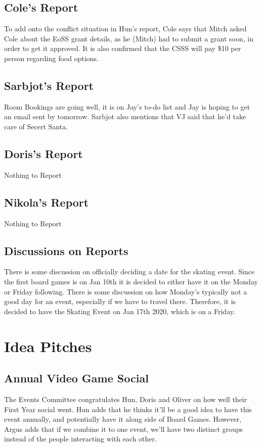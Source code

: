 \documentclass[12pt]{article}
\begin{document}
\subsection{Cole's Report}
\noindent To add onto the conflict situation in Hun's report, Cole says that Mitch asked Cole about the EoSS grant details, as he (Mitch) had to submit a grant soon, in order to get it approved.  It is also confirmed that the CSSS will pay \$10 per person regarding food options. 

\subsection{Sarbjot's Report}
Room Bookings are going well, it is on Jay's to-do list and Jay is hoping to get an email sent by tomorrow.  Sarbjot also mentions that VJ said that he'd take care of Secert Santa.

\subsection{Doris's Report}
Nothing to Report

\subsection{Nikola's Report}
Nothing to Report

\subsection{Discussions on Reports}
\noindent There is some discussion on officially deciding a date for the skating event. Since the first board games is on Jan 10th it is decided to either have it on the Monday or Friday following. There is some discussion on how Monday's typically not a good day for an event, especially if we have to travel there. Therefore, it is decided to have the Skating Event on Jan 17th 2020, which is on a Friday.

\section{Idea Pitches} \label{sec: Idea}
\subsection{Annual Video Game Social}
\noindent The Events Committee congratulates Hun, Doris and Oliver on how well their First Year social went. Hun adds that he thinks it'll be a good idea to have this event annually, and potentially have it along side of Board Games. However, Argus adds that if we combine it to one event, we'll have two distinct groups instead of the people interacting with each other. \\
\end{document}
